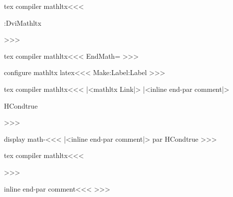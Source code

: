 \<tex compiler mathltx\><<<
    {%
     \a:DviMathltx \mathltxtrue
       \ifOption{mml-fonts}{}{|%
       \IgnoreRule \a:math
       |<sv dvimath par|>\HCode{<![CDATA[}\IgnorePar}
    {\HCode{]]>}\EndIgnoreRule
     \ifOption{mml-fonts}{}{|%
     \mathltxfalse \After:Math \b:DviMathltx
     |<recall dvimath par|>}
>>>


\<tex compiler mathltx\><<<
\def\After:Math{\After:EndMath
   \global\let\After:EndMath=\empty}
\let\After:EndMath=\empty
\def\AfterMath#1{\append:def\After:EndMath{#1}%
   \global\let\After:EndMath=\After:EndMath}
>>>

\<configure mathltx latex\><<<
\let\m:Make:Label\Make:Label
\def\Make:Label#1#2{%
   \ifmathltx \edef\:temp{#1}%
              \expandafter\AfterMath\expandafter{\expandafter\Make:Label
                                                \expandafter{\:temp}{#2}}%
   \else      \m:Make:Label{#1}{#2}%
   \fi
}
>>>



\<tex compiler mathltx\><<<
\newif\ifmathltx \mathltxfalse
\newif\ifmtext \mtextfalse
|<mathltx Link|>
\def\IgnoreRule{\ht:special{t4ht@\string_}}
\def\EndIgnoreRule{\ht:special{t4ht@\string_\string_}}
\Configure{$$} 
   {\IgnorePar
    |<inline end-par comment|>\EndP\DviMath
    \HCode{\string $\string $}}
   {\HCode{\string $\string $}\EndDviMath
       \ShowPar\par{\csname HCondtrue\endcsname\noindent}}
   {\DisplayMathtrue}
\Configure{$}
   {\DviMath
    \HCode{\string $}}
   {\HCode{\string $}\EndDviMath}{}

\newif\ifDisplayMath  \DisplayMathfalse
>>>


\<display math-\><<<
\Configure{$$} 
   {\IgnorePar
    |<inline end-par comment|>\EndP\DviMath }
   {\EndDviMath\ShowPar\csname par\endcsname
     {\csname HCondtrue\endcsname\noindent}}
   {\DisplayMathtrue}%
>>>




\<tex compiler mathltx\><<<
  {\HCode{\string\sqrt}
  }
>>>




\<inline end-par comment\><<<
\ifvmode\else {}\fi
>>>


}}
